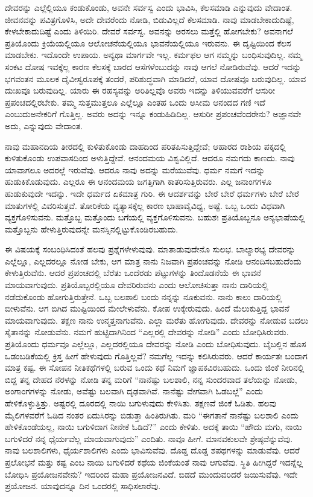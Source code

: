 ದೇವರನ್ನು ಎಲ್ಲೆಲ್ಲಿಯೂ ಕಂಡುಕೊಂಡು, ಅವನೇ ಸರ್ವಸ್ವ ಎಂದು ಭಾವಿಸಿ, ಕೆಲಸಮಾಡಿ ಎನ್ನುವುದು ವೇದಾಂತ. ಜೀವನವನ್ನು ಪವಿತ್ರಗೊಳಿಸಿ, ಅದೇ ದೇವರೆಂದು ನೋಡಿ, ಬಿಡುವಿಲ್ಲದೆ ಕೆಲಸಮಾಡಿ. ನಾವು ಮಾಡಬೇಕಾದುದಿಷ್ಟೆ, ಕೇಳಬೇಕಾದುದಿಷ್ಟೆ ಎಂದು ತಿಳಿಯಿರಿ. ದೇವರೆ ಸರ್ವಸ್ವ. ಅವನನ್ನು ಅರಸಲು ಮತ್ತೆಲ್ಲಿ ಹೋಗಬೇಕು? ಅವನಾಗಲೆ ಪ್ರತಿಯೊಂದು ಕ್ರಿಯೆಯಲ್ಲಿಯೂ ಆಲೋಚನೆಯಲ್ಲಿಯೂ ಭಾವನೆಯಲ್ಲಿಯೂ ಇರುವನು. ಈ ದೃಷ್ಟಿಯಿಂದ ಕೆಲಸ ಮಾಡಬೇಕು. ಇದೊಂದೇ ಉಪಾಯ. ಅನ್ಯಥಾ ಮಾರ್ಗವೇ ಇಲ್ಲ. ಕರ್ಮಫಲ ಆಗ ನಮ್ಮನ್ನು ಬಂಧಿಸುವುದಿಲ್ಲ. ನಮ್ಮ ಸಂಕಟ ದೋಷ ಇವಕ್ಕೆಲ್ಲ ಕಾರಣ ಕೆಲಸಕ್ಕೆ ಬಾರದ ಆಸೆಗಳೆಂಬುದನ್ನು ನಾವು ಆಗಲೆ ನೋಡಿರುವೆವು. ಆದರೆ ಇದನ್ನು ಭಗವಂತನ ಮೂಲಕ ದೈವೀಸ್ವರೂಪಕ್ಕೆ ತಂದರೆ, ಪರಿಶುದ್ಧವಾಗಿ ಮಾಡಿದರೆ, ಯಾವ ದೋಷವೂ ಬರುವುದಿಲ್ಲ. ಯಾವ ದುಃಖವೂ ಬರುವುದಿಲ್ಲ. ಯಾರು ಈ ರಹಸ್ಯವನ್ನು ಅರಿತಿಲ್ಲವೊ ಅವರು ಇದನ್ನು ತಿಳಿಯುವವರೆಗೆ ಆಸುರೀ ಪ್ರಪಂಚದಲ್ಲಿರಬೇಕು. ತಮ್ಮ ಸುತ್ತಮುತ್ತಲೂ ಎಲ್ಲೆಲ್ಲೂ ಎಂತಹ ಒಂದು ಅಸೀಮ ಆನಂದದ ಗಣಿ ಇದೆ ಎಂಬುದು\break ಅನೇಕರಿಗೆ ಗೊತ್ತಿಲ್ಲ. ಅವರು ಅದನ್ನು ಇನ್ನೂ ಕಂಡುಹಿಡಿದಿಲ್ಲ. ಆಸುರೀ ಪ್ರಪಂಚವೆಂದರೇನು? ಅಜ್ಞಾನವೇ ಅದು, ಎನ್ನುವುದು ವೇದಾಂತ.

ನಾವು ಮಹಾನದಿಯ ತೀರದಲ್ಲಿ ಕುಳಿತುಕೊಂಡು ದಾಹದಿಂದ ಪರಿತಪಿಸುತ್ತಿದ್ದೇವೆ; ಆಹಾರದ ರಾಶಿಯ ಪಕ್ಕದಲ್ಲಿ ಕುಳಿತುಕೊಂಡು ಉಪವಾಸದಿಂದ ಅಳುತ್ತಿದ್ದೇವೆ. ಆನಂದಮಯ ವಿಶ್ವವಿಲ್ಲಿದೆ. ಆದರೂ ನಮಗದು ಕಾಣದು. ನಾವು ಯಾವಾಗಲೂ ಅದರಲ್ಲೆ ಇರುವೆವು. ಆದರೂ ನಾವು ಅದನ್ನು ಮರೆಯುವೆವು. ಧರ್ಮ ನಮಗೆ ಇದನ್ನು ಹುಡುಕಿಕೊಡುವುದು. ಎಲ್ಲರೂ ಈ ಆನಂದಮಯ ಜಗತ್ತಿಗಾಗಿ ಕಾತರಿಸುತ್ತಿರುವರು. ಎಲ್ಲ ಜನಾಂಗಗಳೂ ಹುಡುಕುವುದೇ ಇದನ್ನು. ಇದೇ ಧರ್ಮದ ಏಕಮಾತ್ರ ಗುರಿ. ಈ ಆದರ್ಶವನ್ನು ಬೇರೆ ಬೇರೆ ಧರ್ಮಗಳು ಬೇರೆ ಬೇರೆ ಮಾತುಗಳಲ್ಲಿ ವಿವರಿಸುತ್ತವೆ. ತೋರಿಕೆಯ ವ್ಯತ್ಯಾಸಕ್ಕೆಲ್ಲ ಕಾರಣ ಭಾಷಾವೈವಿಧ್ಯ, ಅಷ್ಟೆ. ಒಬ್ಬ ಒಂದು ವಿಧವಾಗಿ ವ್ಯಕ್ತಗೊಳಿಸುವನು. ಮತ್ತೊಬ್ಬ ಮತ್ತೊಂದು ಬಗೆಯಲ್ಲಿ ವ್ಯಕ್ತಗೊಳಿಸುವನು. ಬಹುಶಃ ಪ್ರತಿಯೊಬ್ಬನೂ ಅನ್ಯಭಾಷೆಯಲ್ಲಿ ಮತ್ತೊಬ್ಬನು ಹೇಳುತ್ತಿರುವುದನ್ನೇ ಮನಸ್ಸಿನಲ್ಲಿಟ್ಟುಕೊಂಡಿರಬಹುದು.

ಈ ವಿಷಯಕ್ಕೆ ಸಂಬಂಧಿಸಿದಂತೆ ಹಲವು ಪ್ರಶ್ನೆಗಳೇಳುವುವು. ಮಾತಾಡುವುದೇನೊ ಸುಲಭ. ಬಾಲ್ಯಾರಭ್ಯ ದೇವರನ್ನು ಎಲ್ಲೆಲ್ಲೂ, ಎಲ್ಲದರಲ್ಲೂ ನೋಡ ಬೇಕು, ಆಗ ಮಾತ್ರ ನಾನು ನಿಜವಾಗಿ ಪ್ರಪಂಚವನ್ನು ನೋಡಿ ಆನಂದಿಸಬಹುದೆಂದು ಕೇಳುತ್ತಿರುವೆನು. ಆದರೆ ಪ್ರಪಂಚದಲ್ಲಿ ಬೆರೆತು ಒಂದೆರಡು ಪೆಟ್ಟುಗಳನ್ನು ತಿಂದೊಡನೆಯೆ ಈ ಭಾವನೆ ಮಾಯವಾಗುವುದು. ಪ್ರತಿಯೊಬ್ಬರಲ್ಲಿಯೂ ದೇವರಿರುವನು ಎಂದು ಆಲೋಚಿಸುತ್ತಾ ನಾನು ದಾರಿಯಲ್ಲಿ ನಡೆದುಕೊಂಡು ಹೋಗುತ್ತಿರುತ್ತೇನೆ. ಒಬ್ಬ ಬಲಶಾಲಿ ಬಂದು ನನ್ನನ್ನು ನೂಕುವನು. ನಾನು ಕಾಲು ದಾರಿಯಲ್ಲಿ ಬೀಳುವೆನು. ಆಗ ಬಿಗಿದ ಮುಷ್ಟಿಯಿಂದ ಮೇಲೇಳುವೆನು. ಕೋಪ ಉಕ್ಕೇರುವುದು. ಹಿಂದೆ ಮೆಲುಕುತ್ತಿದ್ದ ಭಾವನೆ ಮಾಯವಾಗುವುದು. ತಕ್ಷಣ ನಾನು ಉನ್ಮತ್ತನಾಗುವೆನು. ಎಲ್ಲಾ ಮರೆತು ಹೋಗುವುದು. ದೇವರನ್ನು ನೋಡುವ ಬದಲು ಸೈತಾನನ್ನು ನೋಡುವೆನು. ನಮಗೆ ಹುಟ್ಟಿದಾಗಿನಿಂದ “ಎಲ್ಲರಲ್ಲಿ ದೇವರನ್ನು ನೋಡಿ” ಎಂದು ಬೋಧಿಸಿರುವರು. ಪ್ರತಿಯೊಂದು ಧರ್ಮವೂ ಎಲ್ಲೆಲ್ಲೂ, ಎಲ್ಲದರಲ್ಲಿಯೂ ದೇವರನ್ನು ನೋಡಿ ಎಂದು ಬೋಧಿಸುವುದು. ಬೈಬಲ್ಲಿನ ಹೊಸ ಒಡಂಬಡಿಕೆಯಲ್ಲಿ ಕ್ರಿಸ್ತ ಹೀಗೆ ಹೇಳುವುದು ಗೊತ್ತಿಲ್ಲವೆ? ನಮಗೆಲ್ಲ ಇದನ್ನು ಕಲಿಸಿರುವರು. ಆದರೆ ಕಾರ್ಯತಃ ಬಂದಾಗ ಮಾತ್ರ ಕಷ್ಟ. ಈ ಸೋಪನ ನೀತಿಕಥೆಗಳಲ್ಲಿ ಬರುವ ಒಂದು ಕಥೆ ನಿಮಗೆ ಜ್ಞಾಪಕವಿರಬಹುದು. ಒಂದು ಜಿಂಕೆ ನೀರಿನಲ್ಲಿ ಬಿದ್ದ ತನ್ನ ದೇಹದ ನೆರಳನ್ನು ನೋಡಿ ತನ್ನ ಮರಿಗೆ “ನಾನೆಷ್ಟು ಬಲಶಾಲಿ, ನನ್ನ ಸುಂದರವಾದ ತಲೆಯನ್ನು ನೋಡು, ಅಂಗಾಂಗಗಳನ್ನು ನೋಡು, ಅವೆಷ್ಟು ಬಲವಾಗಿ ದೃಢವಾಗಿವೆ. ನಾನೆಷ್ಟು ವೇಗವಾಗಿ ಓಡಬಲ್ಲೆ” ಎಂದು ಹೇಳಿಕೊಳ್ಳುತ್ತಿತ್ತು. ಅಷ್ಟರಲ್ಲಿ ದೂರದಲ್ಲಿ ನಾಯಿ ಬಗುಳುವುದು ಕೇಳಿಸಿತು. ತಕ್ಷಣವೆ ಜಿಂಕೆ ಓಡಿತು. ಹಲವು ಮೈಲಿಗಳವರೆಗೆ ಓಡಿದ ನಂತರ ಏದುಸಿರನ್ನು ಬಿಡುತ್ತಾ ಹಿಂತಿರುಗಿತು. ಮರಿ “ಈಗತಾನೆ ನಾನೆಷ್ಟು ಬಲಶಾಲಿ ಎಂದು ಹೇಳಿಕೊಂಡೆಯಲ್ಲ, ನಾಯಿ ಬಗುಳಿದಾಗ ನೀನೇಕೆ ಓಡಿದೆ?” ಎಂದು ಕೇಳಿತು. ಅದಕ್ಕೆ ತಾಯಿ “ಹೌದು ಮಗು, ನಾಯಿ ಬಗುಳಿದರೆ ನನ್ನ ಧೈರ್ಯವೆಲ್ಲ ಮಾಯವಾಗುವುದು” ಎಂದಿತು. ನಾವೂ ಹೀಗೆ. ಮಾನವಕುಲವೇ ಶ್ರೇಷ್ಠವೆನ್ನುವೆವು. ನಾವು ಬಲಶಾಲಿಗಳು, ಧೈರ್ಯಶಾಲಿಗಳು ಎಂದು ಭಾವಿಸುವೆವು. ದೊಡ್ಡ ದೊಡ್ಡ ಶಪಥಗಳನ್ನು ಮಾಡುವೆವು. ಆದರೆ ಪ್ರಲೋಭನೆ ಮತ್ತು ಕಷ್ಟ ಎಂಬ ನಾಯಿ ಬಗುಳಿದರೆ ಕಥೆಯ ಜಿಂಕೆಯಂತೆ ನಾವು ಆಗುವೆವು. ಸ್ಥಿತಿ ಹೀಗಿದ್ದರೆ ಇದನ್ನೆಲ್ಲ ಬೋಧಿಸಿ ಪ್ರಯೋಜನವೇನು? ಇದರಿಂದ ಮಹಾ ಪ್ರಯೋಜನವಿದೆ. ಬಿಡದೆ ಮುಂದುವರಿದರೆ ಜಯಿಸುವೆವು. ಇದೇ ಪ್ರಯೋಜನ. ಯಾವುದನ್ನೂ ದಿನ ಒಂದರಲ್ಲಿ ಸಾಧಿಸಲಾರೆವು.


